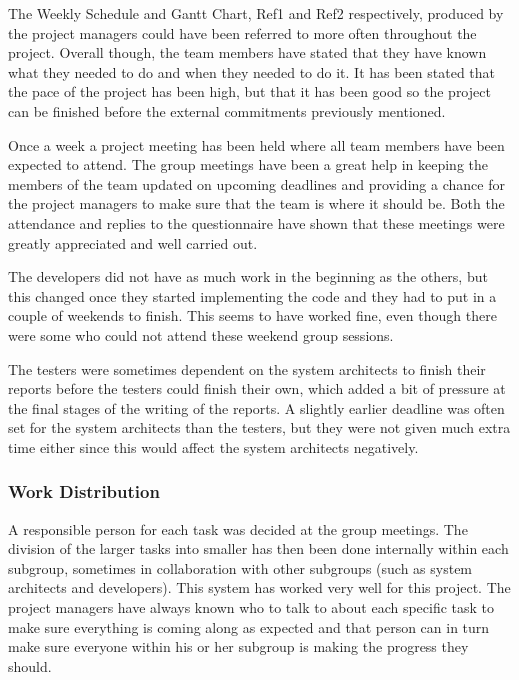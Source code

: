 \documentclass[a4paper]{article}
\begin{document}
The Weekly Schedule and Gantt Chart, Ref1 and Ref2 respectively, produced by the project managers could have been referred to more often throughout the project. Overall though, the team members have stated that they have known what they needed to do and when they needed to do it. It has been stated that the pace of the project has been high, but that it has been good so the project can be finished before the external commitments previously mentioned. 

Once a week a project meeting has been held where all team members have been expected to attend. The group meetings have been a great help in keeping the members of the team updated on upcoming deadlines and providing a chance for the project managers to make sure that the team is where it should be. Both the attendance and replies to the questionnaire have shown that these meetings were greatly appreciated and well carried out.

The developers did not have as much work in the beginning as the others, but this changed once they started implementing the code and they had to put in a couple of weekends to finish. This seems to have worked fine, even though there were some who could not attend these weekend group sessions.

The testers were sometimes dependent on the system architects to finish their reports before the testers could finish their own, which added a bit of pressure at the final stages of the writing of the reports. A slightly earlier deadline was often set for the system architects than the testers, but they were not given much extra time either since this would affect the system architects negatively.



\subsubsection{Work Distribution}

A responsible person for each task was decided at the group meetings. The division of the larger tasks into smaller has then been done internally within each subgroup, sometimes in collaboration with other subgroups (such as system architects and developers). This system has worked very well for this project. The project managers have always known who to talk to about each specific task to make sure everything is coming along as expected and that person can in turn make sure everyone within his or her subgroup is making the progress they should. 
\end{document}

